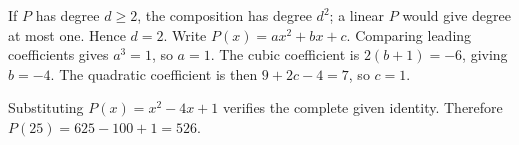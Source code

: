 If $P$ has degree $d\ge2$, the composition has degree $d^2$; a linear $P$ would give degree at most one. Hence $d=2$. Write $P(x)=ax^2+bx+c$. Comparing leading coefficients gives $a^3=1$, so $a=1$. The cubic coefficient is $2(b+1)=-6$, giving $b=-4$. The quadratic coefficient is then $9+2c-4=7$, so $c=1$.

Substituting $P(x)=x^2-4x+1$ verifies the complete given identity. Therefore $\boxed{P(25)=625-100+1=526}$.
